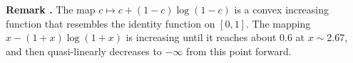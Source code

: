 \documentclass[11pt]{article}
\newcounter{cnt}
\newcommand{\cnt}{\thecnt \stepcounter{cnt}}
\begin{document}
\textbf{Remark \cnt.} The map $ c \mapsto c + (1-c) \log(1-c) $ is a convex increasing function that resembles the identity function on $ [0,1] $. The mapping $ x -(1+x)\log(1+x) $ is increasing until it reaches about $0.6$ at $ x \sim 2.67 $, and then quasi-linearly decreases to $ - \infty $ from this point forward. 


\newpage


\end{document}
